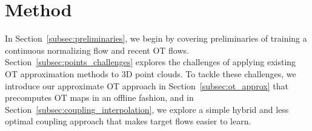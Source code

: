 \vspace{-2mm}
\section{Method}
\vspace{-2mm}

In Section~\ref{subsec:preliminaries}, we begin by covering preliminaries of training a continuous normalizing flow and recent OT flows.
%
Section~\ref{subsec:points_challenges} explores the challenges of applying existing OT approximation methods to 3D point clouds.
%
To tackle these challenges, we introduce our approximate OT approach in Section~\ref{subsec:ot_approx} that precomputes OT maps in an offline fashion, and in Section~\ref{subsec:coupling_interpolation}, we explore a simple hybrid and less optimal coupling approach that makes target flows easier to learn.
%
%
%






% 